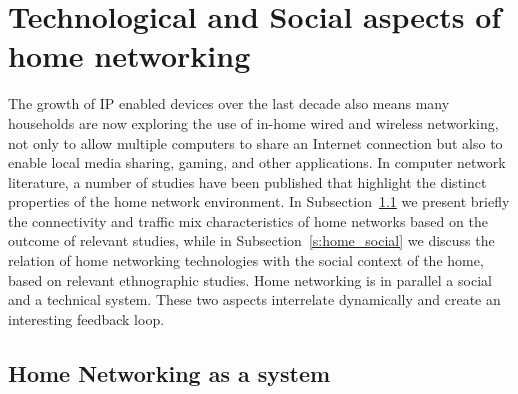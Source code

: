 

\section{Technological and Social aspects of home networking} \label{s:elephant}

The growth of IP enabled devices over the last decade also means many households
are now exploring the use of in-home wired and wireless networking, not only to
allow multiple computers to share an Internet connection but also to enable
local media sharing, gaming, and other applications.  In computer network
literature, a number of studies have been published that highlight the distinct
properties of the home network environment. In
Subsection~\ref{s:home_measurement} we present briefly the connectivity and
traffic mix characteristics of home networks based on the outcome of relevant
studies, while in Subsection~\ref{s:home_social} we discuss the relation of home
networking technologies with the social context of the home, based on relevant
ethnographic studies. Home networking is in parallel a social and a technical
system. These two aspects interrelate dynamically and create an interesting
feedback loop.  



\subsection{Home Networking as a system} \label{s:home_measurement}

